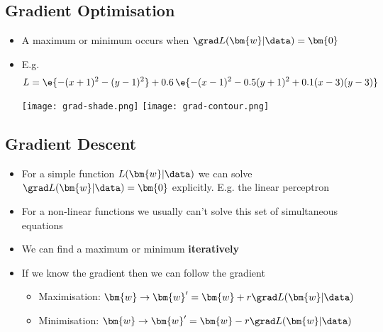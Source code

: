 \Outline %

\begin{slide}
\section[-2]{Gradient Optimisation}

\begin{PauseHighLight}
\hypertarget{descent}{}

\begin{itemize}\squeeze
\item A maximum or minimum occurs when $\grad L(\bm{w}|\data)=\bm{0}$\pause
\item E.g.
\begin{displaymath}
L = \e{-(x+1)^2-(y-1)^2} + 0.6\,\e{-(x-1)^2-0.5(y+1)^2+0.1(x-3)(y-3)}
\end{displaymath}
  \begin{center}
  \texttt{[image: grad-shade.png]}\hfil%
  \texttt{[image: grad-contour.png]}   \pause 
  \end{center}
\end{itemize}
\end{PauseHighLight}
\end{slide}


\begin{slide}
\section{Gradient Descent}

\begin{PauseHighLight}

\begin{itemize}
\item For a simple function $L(\bm{w}|\data)$ we can solve $\grad
  L(\bm{w}|\data)=\bm{0}$ explicitly\pause.  E.g. the linear perceptron\pause
\item For a non-linear functions we usually can't solve this set of
  simultaneous equations\pause
\item We can find a maximum or minimum \textbf{iteratively}\pause
\item If we know the gradient then we can follow the gradient\pause
  \begin{itemize}
  \item Maximisation: $\bm{w} \rightarrow \bm{w}'=\bm{w}+r \grad
    L(\bm{w}|\data)$ \pause
  \item Minimisation: $\bm{w} \rightarrow \bm{w}'=\bm{w}-r \grad
    L(\bm{w}|\data)$ \pause
  \end{itemize}
\end{itemize}


\end{PauseHighLight}
\end{slide}

